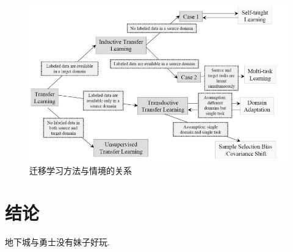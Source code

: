 \documentclass[10pt,journal,compsoc]{IEEEtran}
\begin{document}
\begin{figure}[!ht]
\centering
\includegraphics[width=30pc]{img/survey_fig1.jpg}
\caption{迁移学习方法与情境的关系}
\label{fig:survey_method}
\end{figure}




\section{结论}

地下城与勇士没有妹子好玩. 



\end{document}

